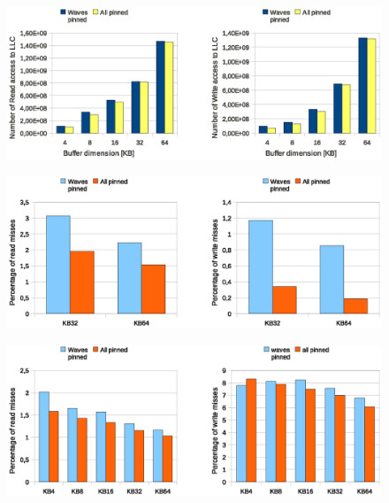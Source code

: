 \begin{figure}[htbp]
\centering
\includegraphics[width=\widefigure]{images/cpuaff/cpuaff_acc_l2_load_store_Xeon.eps}
\caption{}
\label{fig:cpuaff_acc_l2_load_store_xeon}
\end{figure}

\begin{figure}[htbp]
\centering
\includegraphics[width=\widefigure]{images/cpuaff/cpuaff_l2_load_store_Xeon.eps}
\caption{}
\label{fig:cpuaff_l2_load_store_xeon}
\end{figure}
\newpage

\begin{figure}[htbp]
\centering
\includegraphics[width=\widefigure]{images/cpuaff/cpuaff_l1_load_store_i7.eps}
\caption{}
\label{fig:cpuaff_l1_load_i7}
\end{figure}

